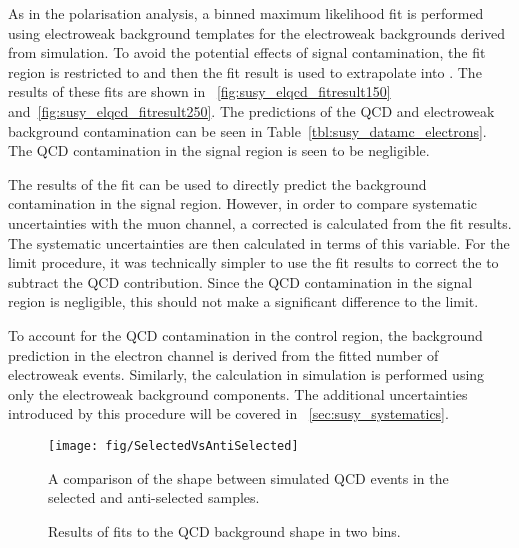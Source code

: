 As in the \PW polarisation analysis, a binned maximum likelihood fit is
performed using electroweak background templates for the electroweak backgrounds
derived from simulation. To avoid the potential effects of signal contamination,
the fit region is restricted to \LPcontrol and then the fit result is used to
extrapolate into \LPsignal. The results of these fits are shown in
\figs~\ref{fig:susy_elqcd_fitresult150}
and~\ref{fig:susy_elqcd_fitresult250}. The predictions of the \ac{QCD} and
electroweak background contamination can be seen in
Table~\ref{tbl:susy_datamc_electrons}. The \ac{QCD} contamination in the signal
region is seen to be negligible.

The results of the fit can be used to directly predict the background
contamination in the signal region. However, in order to compare systematic
uncertainties with the muon channel, a corrected \RCS is calculated from the fit
results. The systematic uncertainties are then calculated in terms of this
variable. For the limit procedure, it was technically simpler to use the fit
results to correct the \NControl to subtract the \ac{QCD} contribution. Since
the \ac{QCD} contamination in the signal region is negligible, this should not
make a significant difference to the limit.

To account for the \ac{QCD} contamination in the control
region, the background prediction in the electron channel is derived from the
fitted number of electroweak events. Similarly, the \RCS calculation in
simulation is performed using only the electroweak background components. The
additional uncertainties introduced by this procedure will be covered in
\sec~\ref{sec:susy_systematics}.


\begin{figure}[h!]
\centering
\texttt{[image: fig/SelectedVsAntiSelected]}
\caption{A comparison of the \LP shape between simulated \ac{QCD} events in the
  selected and anti-selected samples.}
\label{fig:susy_elqcd_selasel}
\end{figure}


\begin{figure}[h!]
\centering
{}\quad
{}
\caption{Results of fits to the \ac{QCD} background shape in two \STlep bins.}
\label{fig:susy_elqcd}
\end{figure}


